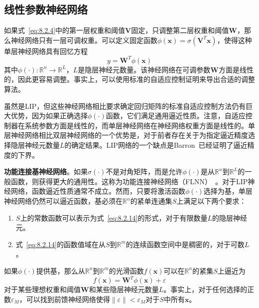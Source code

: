 \documentclass[12pt,a4paper]{ctexart}
\begin{document}
\subsection{线性参数神经网络}

如果式~\eqref{eq:8.2.4}中的第一层权重和阈值$\bm{V}$固定，只调整第二层权重和阈值$\bm{W}$，那么神经网络只有一层可调权重。可以定义固定函数$\phi(\bm{x}) = \sigma(\bm{V}^T \bm{x})$，使得这种单层神经网络具有回忆方程
\begin{equation}\label{eq:8.2.14}
y = \bm{W}^T \phi(\bm{x})
\end{equation}
其中$\phi(\cdot): \mathbb{R}^n \to \mathbb{R}^L$，$L$是隐层神经元数量。该神经网络在可调参数$\bm{W}$方面是线性的，因此更容易调整。事实上，可以使用标准的自适应控制证明来导出合适的调整算法。

虽然是LIP，但这些神经网络相比要求确定回归矩阵的标准自适应控制方法仍有巨大优势，因为如果正确选择$\phi(\cdot)$函数，它们满足通用逼近性质。注意，自适应控制器在系统参数方面是线性的，而单层神经网络在神经网络权重方面是线性的。单层神经网络相比双层神经网络的一个优势是，对于前者存在关于为指定逼近精度选择隐层神经元数量$L$的确定结果。LIP网络的一个缺点是Barron~\cite{barron1993}已经证明了逼近精度的下界。

\textbf{功能连接基神经网络}。如果$\sigma(\cdot)$不是对角矩阵，而是允许$\phi(\cdot)$是从$\mathbb{R}^n$到$\mathbb{R}^L$的一般函数，则获得更大的通用性。这称为功能连接神经网络（FLNN）~\cite{sadegh1993}。对于LIP神经网络，函数逼近性质通常不成立。然而，只要将激活函数$\phi(\cdot)$选择为基，单层神经网络仍然可以逼近函数，基必须在$\mathbb{R}^n$的紧单连通集$S$上满足以下两个要求：

\begin{enumerate}
    \item $S$上的常数函数可以表示为式~\eqref{eq:8.2.14}的形式，对于有限数量$L$的隐层神经元。
    \item 式~\eqref{eq:8.2.14}的函数值域在从$S$到$\mathbb{R}^m$的连续函数空间中是稠密的，对于可数$L$。
\end{enumerate}

如果$\phi(\cdot)$提供基，那么从$\mathbb{R}^n$到$\mathbb{R}^m$的光滑函数$f(\bm{x})$可以在$\mathbb{R}^n$的紧集$S$上逼近为
\begin{equation}\label{eq:8.2.15}
f(\bm{x}) = \bm{W}^T \phi(\bm{x}) + \varepsilon
\end{equation}
对于某些理想权重和阈值$\bm{W}$和某些隐层神经元数量$L$。事实上，对于任何选择的正数$\varepsilon_M$，可以找到前馈神经网络使得$\|\varepsilon\| < \varepsilon_M$对于$S$中所有$\bm{x}$。
\end{document}
